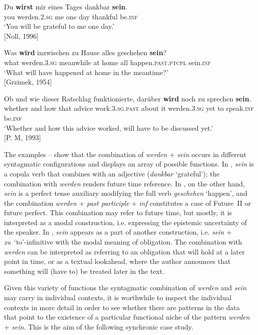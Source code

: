 \documentclass[output=paper,colorlinks,citecolor=brown]{langscibook}
\begin{document}
\ea \label{ex:smirnova:13}
\gll Du \textbf{wirst} mir eines Tages dankbar \textbf{sein}. \\
    you werden.\textsc{2.sg} me one day thankful be.\textsc{inf} \\
\glt `You will be grateful to me one day.'\\
\hfill [Noll, 1996]
\z

\ea\label{ex:smirnova:14}
\gll Was \textbf{wird} inzwischen zu Hause alles geschehen \textbf{sein}? \\
    what werden.\textsc{3.sg} meanwhile at home all happen.\textsc{past.ptcpl} sein.\textsc{inf} \\
\glt `What will have happened at home in the meantime?'\\
\hfill [Grzimek, 1954]
\z

\ea\label{ex:smirnova:15}
\gll Ob und wie dieser Ratschlag funktionierte, darüber \textbf{wird} noch zu sprechen \textbf{sein}.\\
    whether and how that advice work.\textsc{3.sg.past} {about it} werden.\textsc{3.sg} yet to speak.\textsc{inf} be.\textsc{inf} \\
\glt `Whether and how this advice worked, will have to be discussed yet.'\\
\hfill [P. M, 1993]

\z

The examples -- show that the combination of \emph{werden} + \emph{sein} occurs in different syntagmatic configurations and displays an array of possible functions. In , \emph{sein} is a copula verb that combines with an adjective (\emph{dankbar} `grateful'); the combination with \emph{werden} renders future time reference. In , on the other hand, \emph{sein} is a perfect tense auxiliary modifying the full verb \emph{geschehen} `happen', and the combination \emph{werden} + \emph{past participle} + \emph{inf} constitutes a case of Future~II or future perfect. This combination may refer to future time, but mostly, it is interpreted as a modal construction, i.e. expressing the epistemic uncertainty of the speaker. In , \emph{sein} appears as a part of another construction, i.e. \emph{sein} + \emph{zu}~`to'-infinitive with the modal meaning of obligation. The combination with \emph{werden} can be interpreted as referring to an obligation that will hold at a later point in time, or as a textual lookahead, where the author announces that something will (have to) be treated later in the text.
\par Given this variety of functions the syntagmatic combination of \emph{werden} and \emph{sein} may carry in individual contexts, it is worthwhile to inspect the individual contexts in more detail in order to see whether there are patterns in the data that point to the existence of a particular functional niche of the pattern \emph{werden} + \emph{sein}. This is the aim of the following synchronic case study.
\end{document}
